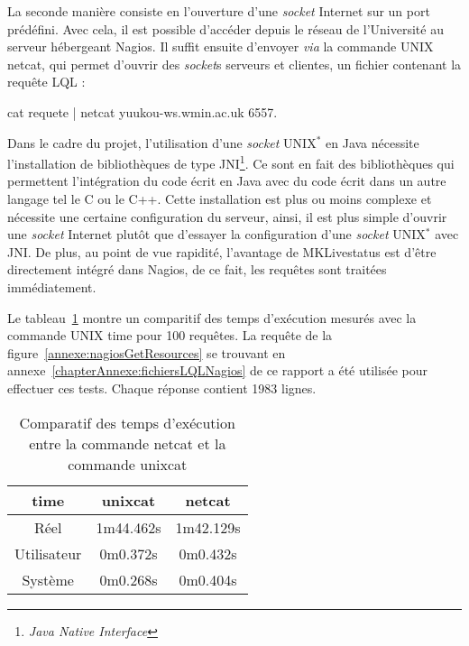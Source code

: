 La seconde mani\`ere consiste en l'ouverture d'une \textit{socket} Internet sur un port pr\'ed\'efini.
Avec cela, il est possible d'acc\'eder depuis le r\'eseau de l'Universit\'e au serveur h\'ebergeant Nagios.
Il suffit ensuite d'envoyer \textit{via} la commande UNIX \textsf{netcat}, qui permet d'ouvrir des \textit{socket}s serveurs et clientes, un fichier contenant la requ\^ete LQL :

\begin{center}
	\textsf{cat requete | netcat yuukou-ws.wmin.ac.uk 6557}.

\end{center}

Dans le cadre du projet, l'utilisation d'une \textit{socket} UNIX$^*$ en Java n\'ecessite l'installation de biblioth\`eques de type JNI\protect\footnote{\textit{Java Native Interface}}.
Ce sont en fait des biblioth\`eques qui permettent l'int\'egration du code \'ecrit en Java avec du code \'ecrit dans un autre langage tel le C ou le C++.
Cette installation est plus ou moins complexe et n\'ecessite une certaine configuration du serveur, ainsi, il est plus simple d'ouvrir une \textit{socket} Internet plut\^ot que d'essayer la configuration d'une \textit{socket} UNIX$^*$ avec JNI.
De plus, au point de vue rapidit\'e, l'avantage de MKLivestatus est d'\^etre directement int\'egr\'e dans Nagios, de ce fait, les requ\^etes sont trait\'ees imm\'ediatement.

Le tableau~\ref{table:comparatifTemps} montre un comparitif des temps d'ex\'ecution mesur\'es avec la commande UNIX \textsf{time} pour 100 requ\^etes.
La requ\^ete de la figure~\ref{annexe:nagiosGetResources} se trouvant en annexe~\ref{chapterAnnexe:fichiersLQLNagios} de ce rapport a \'et\'e utilis\'ee pour effectuer ces tests.
Chaque r\'eponse contient 1983 lignes.

\begin{table}[!ht]
	\centering
	\begin{tabular}{|>{\columncolor{grisclair}}c|c|c|}
		\hline
		\rowcolor{grisclair} \textbf{time} & \textbf{unixcat} & \textbf{netcat}\\
		\hline
		R\'eel & 1m44.462s & 1m42.129s\\
		\hline
		Utilisateur & 0m0.372s & 0m0.432s\\
		\hline
		Syst\`eme & 0m0.268s & 0m0.404s\\
		\hline

	\end{tabular}

	\caption{Comparatif des temps d'ex\'ecution entre la commande \textsf{netcat} et la commande \textsf{unixcat}}
	\label{table:comparatifTemps}

\end{table}

